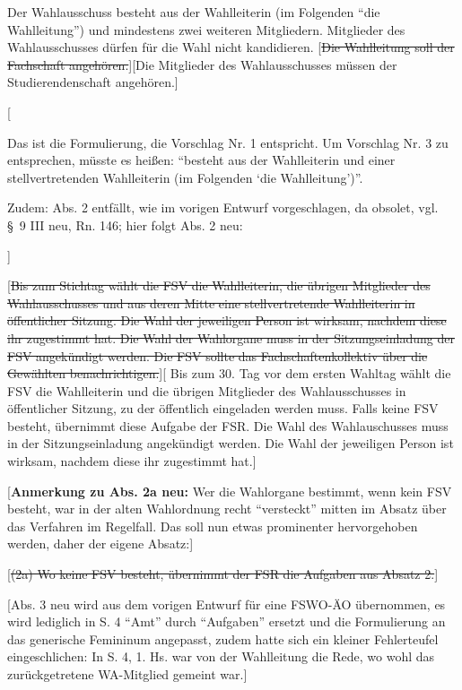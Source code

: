 \documentclass[%
draft,%
multilinesections%
]{fswo}
\newcommand\oldT[1]  {{\color{Gray}[\st{#1}]}}
\newcommand\newT[1]  {{\color{Green}[#1]}}
\newcommand\bemFr[1] {{\color{Red}[#1]}}
\newcommand\bemFe[1] {{\color{Cyan}[#1]}}
\newcommand\oldT[1]{}%
\newcommand\newT[1]{#1}
\newcommand\bemFr[1]{}%
\newcommand\bemFe[1]{}%
\newcommand\change[2]{\oldT{#1}\newT{#2}}
\begin{document}
\begin{contract}
Der Wahlausschuss besteht aus der Wahlleiterin (im Folgenden \enquote{die Wahlleitung}) und mindestens zwei weiteren Mitgliedern.
Mitglieder des Wahlausschusses dürfen für die Wahl nicht kandidieren.
\change{Die Wahlleitung soll der Fachschaft angehören.}{Die Mitglieder des Wahlausschusses müssen der Studierendenschaft angehören.}
%
\bemFr{%
\begin{addmargin}{1cm}
Das ist die Formulierung, die Vorschlag Nr. 1 entspricht.
Um Vorschlag Nr. 3 zu entsprechen, müsste es heißen: \enquote{besteht aus der Wahlleiterin und einer stellvertretenden Wahlleiterin (im Folgenden \enquote{die Wahlleitung})}.

Zudem: Abs. 2 entfällt, wie im vorigen Entwurf vorgeschlagen, da obsolet, vgl. \S~9 III neu, Rn. 146; hier folgt Abs. 2 neu:
\end{addmargin}}

\change{Bis zum Stichtag wählt die FSV die Wahlleiterin, die übrigen Mitglieder des Wahlausschusses und aus deren Mitte eine stellvertretende Wahlleiterin in öffentlicher Sitzung.
Die Wahl der jeweiligen Person ist wirksam, nachdem diese ihr zugestimmt hat.
Die Wahl der Wahlorgane muss in der Sitzungseinladung der FSV angekündigt werden.
Die FSV sollte das Fachschaftenkollektiv über die Gewählten benachrichtigen.}{%
Bis zum 30. Tag vor dem ersten Wahltag wählt die FSV die Wahlleiterin und die übrigen Mitglieder des Wahlausschusses in öffentlicher Sitzung, zu der öffentlich eingeladen werden muss.
Falls keine FSV besteht, übernimmt diese Aufgabe der FSR.
Die Wahl des Wahlauschusses muss in der Sitzungseinladung angekündigt werden.
Die Wahl der jeweiligen Person ist wirksam, nachdem diese ihr zugestimmt hat.}\\
%
\begin{addmargin}{1cm}
\bemFr{\textbf{Anmerkung zu Abs. 2a neu:} Wer die Wahlorgane bestimmt, wenn kein FSV besteht,
war in der alten Wahlordnung recht \enquote{versteckt} mitten im Absatz über das Verfahren im Regelfall.
Das soll nun etwas prominenter hervorgehoben werden, daher der eigene Absatz:}
\end{addmargin}
%
\oldT{(2a) Wo keine FSV besteht, übernimmt der FSR die Aufgaben aus Absatz 2.}


\begin{addmargin}{1cm}
\bemFr{Abs. 3 neu wird aus dem vorigen Entwurf für eine FSWO-ÄO übernommen, es wird lediglich in S. 4 \enquote{Amt} durch \enquote{Aufgaben} ersetzt und die Formulierung an das generische Femininum angepasst,
zudem hatte sich ein kleiner Fehlerteufel eingeschlichen:
In S. 4, 1. Hs. war von der Wahlleitung die Rede, wo wohl das zurückgetretene WA-Mitglied gemeint war.}
\end{addmargin}


\end{contract}
\end{document}
